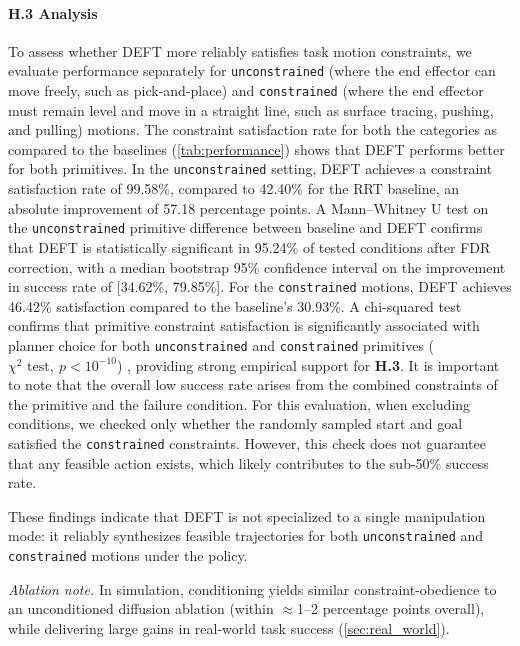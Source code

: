\paragraph{\textbf{H.3} Analysis}%
To assess whether DEFT more reliably satisfies task motion constraints, we evaluate performance separately for \texttt{unconstrained} (where the end effector can move freely, such as pick-and-place) and \texttt{constrained} (where the end effector must remain level and move in a straight line, such as surface tracing, pushing, and pulling) motions. The constraint satisfaction rate for both the categories as compared to the baselines (\cref{tab:performance}) shows that DEFT performs better for both primitives.
In the \texttt{unconstrained} setting, DEFT achieves a constraint satisfaction rate of 99.58\%, compared to 42.40\% for the RRT baseline, an absolute improvement of 57.18 percentage points. 
A Mann--Whitney U test on the \texttt{unconstrained} primitive difference between baseline and DEFT confirms that DEFT is statistically significant in 95.24\% of tested conditions after FDR correction, with a median bootstrap 95\% confidence interval on the improvement in success rate of [34.62\%, 79.85\%]. 
For the \texttt{constrained} motions, DEFT achieves 46.42\% satisfaction compared to the baseline's 30.93\%. A chi-squared test confirms that primitive constraint satisfaction is significantly associated with planner choice for both \texttt{unconstrained} and \texttt{constrained} primitives (\(\chi^2\text{ test},\ p<10^{-10}\)) , providing strong empirical support for \textbf{H.3}. It is important to note that the overall low success rate arises from the combined constraints of the primitive and the failure condition. For this evaluation, when excluding conditions, we checked only whether the randomly sampled start and goal satisfied the \texttt{constrained} constraints. However, this check does not guarantee that any feasible action exists, which likely contributes to the sub-50\% success rate.

These findings indicate that \textsc{DEFT} is not specialized to a single manipulation mode: it reliably synthesizes feasible trajectories for both \texttt{unconstrained} and \texttt{constrained} motions under the policy. 

\noindent\emph{Ablation note.} In simulation, conditioning yields similar constraint-obedience to an unconditioned diffusion ablation (within \(\approx\)1–2 percentage points overall), while delivering large gains in real-world task success (\cref{sec:real_world}).
 \vspace{-5pt}


